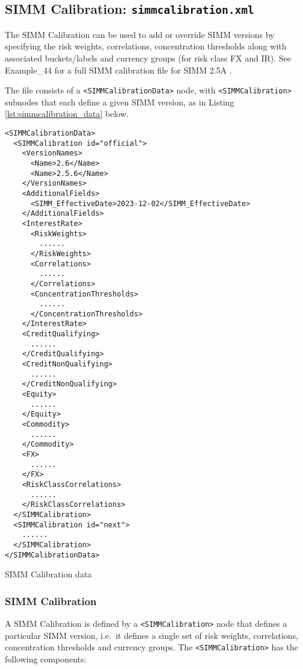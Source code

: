 \subsection{SIMM Calibration: {\tt simmcalibration.xml}}\label{sec:simmcalibration}

The SIMM Calibration can be used to add or override SIMM versions by specifying the risk weights, correlations,
concentration thresholds along with associated buckets/labels and currency groups (for risk class FX and IR).
See Example\_44 for a full SIMM calibration file for SIMM 2.5A \cite{SIMM2.5A}.

The file consists of a {\tt <SIMMCalibrationData>} node, with {\tt <SIMMCalibration>} subnodes that each define a given
SIMM version, as in Listing \ref{lst:simmcalibration_data} below.

\begin{listing}[H]
\begin{verbatim}
<SIMMCalibrationData>
  <SIMMCalibration id="official">
    <VersionNames>
      <Name>2.6</Name>
      <Name>2.5.6</Name>
    </VersionNames>
    <AdditionalFields>
      <SIMM_EffectiveDate>2023-12-02</SIMM_EffectiveDate>
    </AdditionalFields>
    <InterestRate>
      <RiskWeights>
        ......
      </RiskWeights>
      <Correlations>
        ......
      </Correlations>
      <ConcentrationThresholds>
        ......
      </ConcentrationThresholds>
    </InterestRate>
    <CreditQualifying>
      ......
    </CreditQualifying>
    <CreditNonQualifying>
      ......
    </CreditNonQualifying>
    <Equity>
      ......
    </Equity>
    <Commodity>
      ......
    </Commodity>
    <FX>
      ......
    </FX>
    <RiskClassCorrelations>
      ......
    </RiskClassCorrelations>
  </SIMMCalibration>
  <SIMMCalibration id="next">
    ......
  </SIMMCalibration>
</SIMMCalibrationData>
\end{verbatim}
\caption{SIMM Calibration data}
\label{lst:simmcalibration_data}
\end{listing}

\subsubsection{SIMM Calibration}

A SIMM Calibration is defined by a {\tt <SIMMCalibration>} node that defines a particular SIMM version, i.e.\ it defines a single set of risk weights, correlations, concentration thresholds and currency groups. The {\tt <SIMMCalibration>} has the following components:

